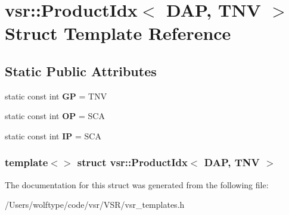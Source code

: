 \hypertarget{structvsr_1_1_product_idx_3_01_d_a_p_00_01_t_n_v_01_4}{\section{vsr\-:\-:Product\-Idx$<$ D\-A\-P, T\-N\-V $>$ Struct Template Reference}
\label{structvsr_1_1_product_idx_3_01_d_a_p_00_01_t_n_v_01_4}
}
\subsection*{Static Public Attributes}
\begin{DoxyCompactItemize}
\item 
\hypertarget{structvsr_1_1_product_idx_3_01_d_a_p_00_01_t_n_v_01_4_a63e6870d4a9a4f959cf186713d223a44}{static const int {\bfseries G\-P} = T\-N\-V}\label{structvsr_1_1_product_idx_3_01_d_a_p_00_01_t_n_v_01_4_a63e6870d4a9a4f959cf186713d223a44}

\item 
\hypertarget{structvsr_1_1_product_idx_3_01_d_a_p_00_01_t_n_v_01_4_a1ac042a0efd5df679aa5842399e221e3}{static const int {\bfseries O\-P} = S\-C\-A}\label{structvsr_1_1_product_idx_3_01_d_a_p_00_01_t_n_v_01_4_a1ac042a0efd5df679aa5842399e221e3}

\item 
\hypertarget{structvsr_1_1_product_idx_3_01_d_a_p_00_01_t_n_v_01_4_adad8070c9e01ae06660d9befac56b6f5}{static const int {\bfseries I\-P} = S\-C\-A}\label{structvsr_1_1_product_idx_3_01_d_a_p_00_01_t_n_v_01_4_adad8070c9e01ae06660d9befac56b6f5}

\end{DoxyCompactItemize}
\subsubsection*{template$<$$>$ struct vsr\-::\-Product\-Idx$<$ D\-A\-P, T\-N\-V $>$}



The documentation for this struct was generated from the following file\-:\begin{DoxyCompactItemize}
\item 
/\-Users/wolftype/code/vsr/\-V\-S\-R/vsr\-\_\-templates.\-h\end{DoxyCompactItemize}
